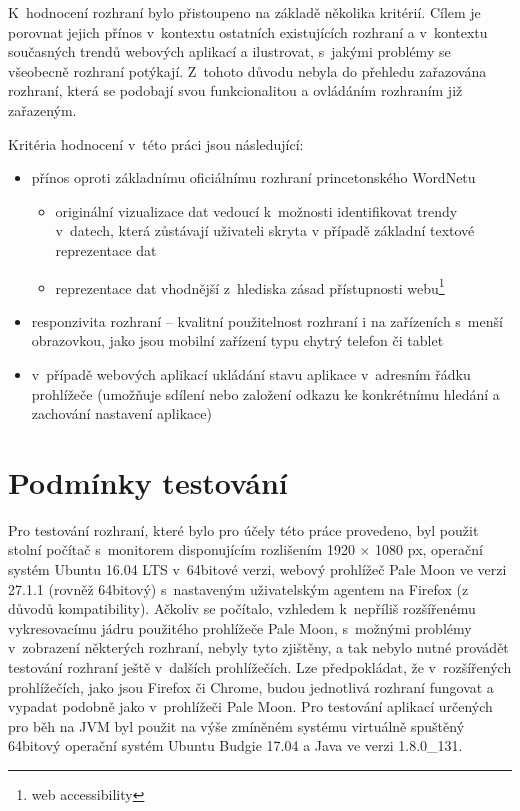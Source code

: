 \documentclass[a4paper, 11pt, oneside, showtrims]{book}
\begin{document}
				K~hodnocení rozhraní bylo přistoupeno na základě několika kritérií. Cílem je porovnat jejich přínos v~kontextu ostatních existujících rozhraní a v~kontextu současných trendů webových aplikací a ilustrovat, s~jakými problémy se všeobecně rozhraní potýkají.  Z~tohoto důvodu nebyla do přehledu zařazována rozhraní, která se podobají svou funkcionalitou a ovládáním rozhraním již zařazeným. 

				Kritéria hodnocení v~této práci jsou následující:

					\begin{itemize}
						\item přínos oproti základnímu oficiálnímu rozhraní princetonského WordNetu
							\begin{itemize}
								\item originální vizualizace dat vedoucí k~možnosti identifikovat trendy v~datech, která zůstávají uživateli skryta v případě základní textové reprezentace dat
								\item reprezentace dat vhodnější z~hlediska zásad přístupnosti webu\footnote{web accessibility}
							\end{itemize}
						\item responzivita rozhraní -- kvalitní použitelnost rozhraní i na zařízeních s~menší obrazovkou, jako jsou mobilní zařízení typu chytrý telefon či tablet
						\item v~případě webových aplikací ukládání stavu aplikace v~adresním řádku prohlížeče (umožňuje sdílení nebo založení odkazu ke konkrétnímu hledání a zachování nastavení aplikace)
					\end{itemize}


			\section{Podmínky testování}

				Pro testování rozhraní, které bylo pro účely této práce provedeno, byl použit stolní počítač s~monitorem disponujícím rozlišením 1920 × 1080 px, operační systém Ubuntu 16.04 LTS v~64bitové verzi, webový prohlížeč Pale Moon ve verzi 27.1.1 (rovněž 64bitový) s~nastaveným uživatelským agentem na Firefox (z důvodů kompatibility). Ačkoliv se počítalo, vzhledem k~nepříliš rozšířenému vykresovacímu jádru použitého prohlížeče Pale Moon, s~možnými problémy v~zobrazení některých rozhraní, nebyly tyto zjištěny, a tak nebylo nutné provádět testování rozhraní ještě v~dalších prohlížečích. Lze předpokládat, že v~rozšířených prohlížečích, jako jsou Firefox či Chrome, budou jednotlivá rozhraní fungovat a vypadat podobně jako v~prohlížeči Pale Moon. Pro testování aplikací určených pro běh na JVM byl použit na výše zmíněném systému virtuálně spuštěný 64bitový operační systém Ubuntu Budgie 17.04 a Java ve verzi 1.8.0\_131.
\end{document}
